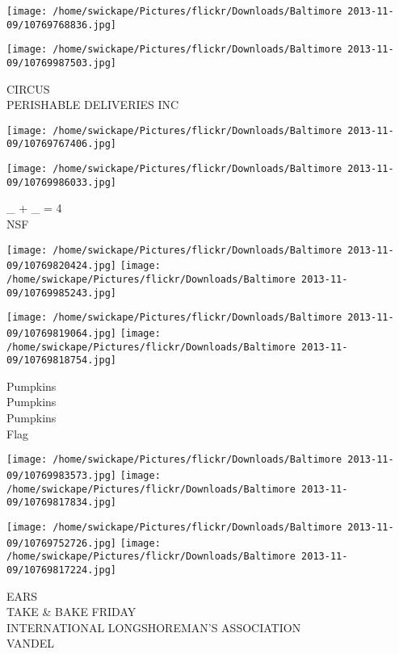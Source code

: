 \documentclass[10pt,letterpaper]{article}
\begin{document}
\texttt{[image: /home/swickape/Pictures/flickr/Downloads/Baltimore 2013-11-09/10769768836.jpg]}

\vspace{0.25in}
\texttt{[image: /home/swickape/Pictures/flickr/Downloads/Baltimore 2013-11-09/10769987503.jpg]}

CIRCUS\\
PERISHABLE DELIVERIES INC\\
\pagebreak

\texttt{[image: /home/swickape/Pictures/flickr/Downloads/Baltimore 2013-11-09/10769767406.jpg]}

\vspace{0.25in}
\texttt{[image: /home/swickape/Pictures/flickr/Downloads/Baltimore 2013-11-09/10769986033.jpg]}

\_ + \_ = 4\\
NSF\\
\pagebreak

\texttt{[image: /home/swickape/Pictures/flickr/Downloads/Baltimore 2013-11-09/10769820424.jpg]}
\texttt{[image: /home/swickape/Pictures/flickr/Downloads/Baltimore 2013-11-09/10769985243.jpg]}

\texttt{[image: /home/swickape/Pictures/flickr/Downloads/Baltimore 2013-11-09/10769819064.jpg]}
\texttt{[image: /home/swickape/Pictures/flickr/Downloads/Baltimore 2013-11-09/10769818754.jpg]}

Pumpkins\\
Pumpkins\\
Pumpkins\\
Flag\\
\pagebreak

\texttt{[image: /home/swickape/Pictures/flickr/Downloads/Baltimore 2013-11-09/10769983573.jpg]}
\texttt{[image: /home/swickape/Pictures/flickr/Downloads/Baltimore 2013-11-09/10769817834.jpg]}

\texttt{[image: /home/swickape/Pictures/flickr/Downloads/Baltimore 2013-11-09/10769752726.jpg]}
\texttt{[image: /home/swickape/Pictures/flickr/Downloads/Baltimore 2013-11-09/10769817224.jpg]}

EARS\\
TAKE \& BAKE FRIDAY\\
INTERNATIONAL LONGSHOREMAN'S ASSOCIATION\\
VANDEL\\
\pagebreak
\end{document}
